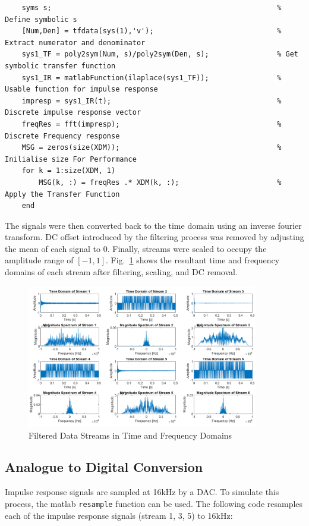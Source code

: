 \documentclass[12pt]{article}
\numberwithin{equation}{section}
\numberwithin{figure}{section}
\numberwithin{table}{section}
\begin{document}
\begin{verbatim}
    syms s;                                                     % Define symbolic s
    [Num,Den] = tfdata(sys(1),'v');                             % Extract numerator and denominator
    sys1_TF = poly2sym(Num, s)/poly2sym(Den, s);                % Get symbolic transfer function
    sys1_IR = matlabFunction(ilaplace(sys1_TF));                % Usable function for impulse response
    impresp = sys1_IR(t);                                       % Discrete impulse response vector
    freqRes = fft(impresp);                                     % Discrete Frequency response
    MSG = zeros(size(XDM));                                     % Inilialise size For Performance
    for k = 1:size(XDM, 1)
        MSG(k, :) = freqRes .* XDM(k, :);                       % Apply the Transfer Function
    end
\end{verbatim}

The signals were then converted back to the time domain using an inverse
fourier transform. DC offset introduced by the filtering process was removed by
adjusting the mean of each signal to 0. Finally, streams were scaled to occupy
the amplitude range of $[-1, 1]$. Fig.~\ref{fig:p3-filteredstreams} shows the
resultant time and frequency domains of each stream after filtering, scaling,
and DC removal.

\begin{figure}[ht]
    \centering
    \includegraphics[width=0.9\textwidth]{figures/p3-filteredstreams.png}
    \caption{Filtered Data Streams in Time and Frequency Domains\label{fig:p3-filteredstreams}}
\end{figure}
\pagebreak
\subsection{Analogue to Digital Conversion}
Impulse response signals are sampled at 16kHz by a DAC\@. To simulate this
process, the matlab \verb+resample+ function can be used. The following code
resamples each of the impulse response signals (stream 1, 3, 5) to 16kHz:
\end{document}

